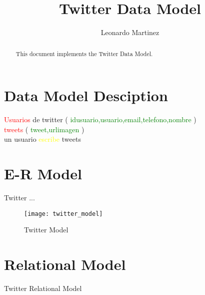 \documentclass[10pt]{article}         %
\title{Twitter Data Model}
\author{Leonardo Martinez}
\begin{document}
\maketitle

\begin{abstract}
This document implements the Twitter Data Model.
\end{abstract}

\section{Data Model Desciption}


\textcolor{red}{Usuarios} de twitter ( \textcolor{green}{idusuario,usuario,email,telefono,nombre} )\\

\textcolor{red}{tweets} ( \textcolor{green}{tweet,urlimagen} )\\

un usuario \textcolor{yellow}{escribe} tweets

\section{E-R Model}

Twitter ...

\begin{figure}[h]
     \texttt{[image: twitter\_model]}
     \caption{Twitter Model}
\end{figure}
   
\section{Relational Model}
Twitter Relational Model
\end{document}

